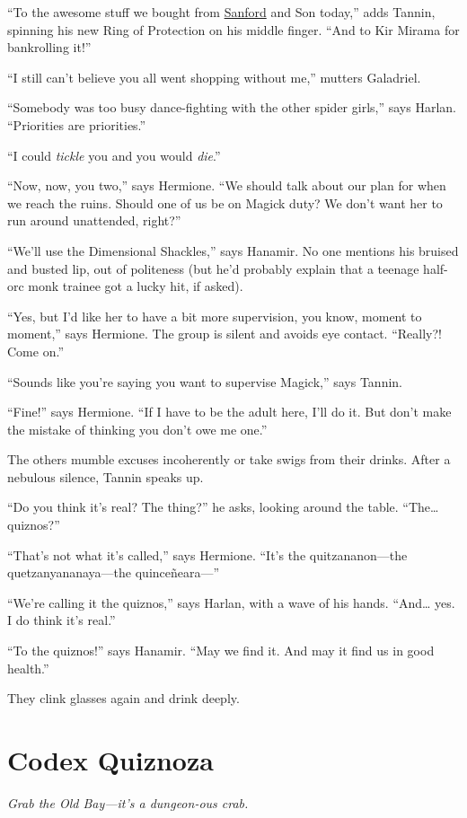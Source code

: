 \documentclass[smalldemyvopaper,11pt,twoside,onecolumn,openright,extrafontsizes]{memoir}
\newcommand{\chapdesc}[1]{
    \begin{flushright}
    \emph{{#1}}
    \end{flushright}
    \vspace{26pt}
}
\begin{document}
``To the awesome stuff we bought from
\href{/characters/sanford/}{Sanford} and Son today,'' adds Tannin,
spinning his new Ring of Protection on his middle finger. ``And to Kir
Mirama for bankrolling it!''

``I still can't believe you all went shopping without me,'' mutters
Galadriel.

``Somebody was too busy dance-fighting with the other spider girls,''
says Harlan. ``Priorities are priorities.''

``I could \emph{tickle} you and you would \emph{die}.''

``Now, now, you two,'' says Hermione. ``We should talk about our plan
for when we reach the ruins. Should one of us be on Magick duty? We
don't want her to run around unattended, right?''

``We'll use the Dimensional Shackles,'' says Hanamir. No one mentions
his bruised and busted lip, out of politeness (but he'd probably explain
that a teenage half-orc monk trainee got a lucky hit, if asked).

``Yes, but I'd like her to have a bit more supervision, you know, moment
to moment,'' says Hermione. The group is silent and avoids eye contact.
``Really?! Come on.''

``Sounds like you're saying you want to supervise Magick,'' says Tannin.

``Fine!'' says Hermione. ``If I have to be the adult here, I'll do it.
But don't make the mistake of thinking you don't owe me one.''

The others mumble excuses incoherently or take swigs from their drinks.
After a nebulous silence, Tannin speaks up.

``Do you think it's real? The thing?'' he asks, looking around the
table. ``The\ldots{} quiznos?''

``That's not what it's called,'' says Hermione. ``It's the
quitzananon---the quetzanyananaya---the quinceñeara---''

``We're calling it the quiznos,'' says Harlan, with a wave of his hands.
``And\ldots{} yes. I do think it's real.''

``To the quiznos!'' says Hanamir. ``May we find it. And may it find us
in good health.''

They clink glasses again and drink deeply.


\chapter{Codex Quiznoza}
\chapdesc{Grab the Old Bay—it's a dungeon-ous crab.}
\end{document}

